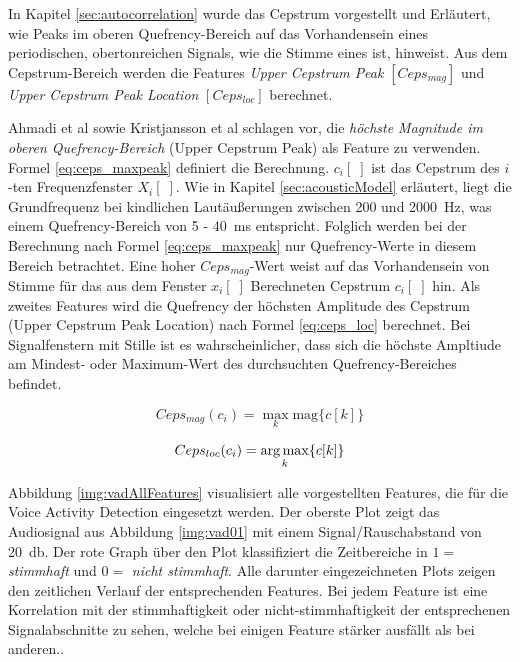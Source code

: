In Kapitel \ref{sec:autocorrelation} wurde das Cepstrum vorgestellt und Erläutert, wie Peaks im oberen Quefrency-Bereich auf das Vorhandensein eines periodischen, obertonreichen Signals, wie die Stimme eines ist, hinweist. Aus dem Cepstrum-Bereich werden die Features \emph{Upper Cepstrum Peak} $[ Ceps_{mag} ]$ und \emph{Upper Cepstrum Peak Location} $[ Ceps_{loc} ]$ berechnet.

Ahmadi et al \cite{vad_ceps} sowie Kristjansson et al\cite{vad_Lisboa} schlagen vor, die \emph{höchste Magnitude im oberen Quefrency-Bereich} (Upper Cepstrum Peak) als Feature zu verwenden. Formel \ref{eq:ceps_maxpeak} definiert die Berechnung. $c_i[\;]$ ist das Cepstrum des $i$-ten Frequenzfenster $X_i[\;]$. Wie in Kapitel \ref{sec:acousticModel} erläutert, liegt die Grundfrequenz bei kindlichen Lautäußerungen zwischen 200 und \SI{2000}{\hertz}, was einem Quefrency-Bereich von 5 - \SI{40}{\milli\second} entspricht. Folglich werden bei der Berechnung nach Formel \ref{eq:ceps_maxpeak} nur Quefrency-Werte in diesem Bereich betrachtet. Eine hoher $Ceps_{mag}$-Wert weist auf das Vorhandensein von Stimme für das aus dem Fenster $x_i[\;]$ Berechneten Cepstrum $c_i[\;]$ hin. Als zweites Features wird die Quefrency der höchsten Amplitude des Cepstrum (Upper Cepstrum Peak Location) nach Formel \ref{eq:ceps_loc} berechnet. Bei Signalfenstern mit Stille ist es wahrscheinlicher, dass sich die höchste Ampltiude am Mindest- oder Maximum-Wert des durchsuchten Quefrency-Bereiches befindet.

\begin{equation}
Ceps_{mag}(c_i) = \max_{k}\text{mag}\{c[k]\}
\label{eq:ceps_maxpeak}
\end{equation}

\begin{equation}
Ceps_{loc}(c_i) = \operatorname*{arg\,max}_{k}\{c[k]\}
\label{eq:ceps_loc}
\end{equation}


Abbildung \ref{img:vadAllFeatures} visualisiert alle vorgestellten Features, die für die Voice Activity Detection eingesetzt werden. Der oberste Plot zeigt das Audiosignal aus Abbildung \ref{img:vad01} mit einem Signal/Rauschabstand von \SI{20}{\decibel}. Der rote Graph über den Plot klassifiziert die Zeitbereiche in $1 = $ \emph{stimmhaft} und $0 = $ \emph{nicht stimmhaft}. Alle darunter eingezeichneten Plots zeigen den zeitlichen Verlauf der entsprechenden Features. Bei jedem Feature ist eine Korrelation mit der stimmhaftigkeit oder nicht-stimmhaftigkeit der entsprechenen Signalabschnitte zu sehen, welche bei einigen Feature stärker ausfällt als bei anderen..

